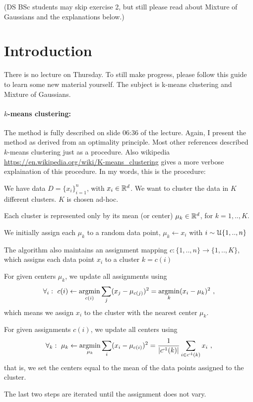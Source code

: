 

\renewcommand{\course}{Machine Learning}
\renewcommand{\exnum}{9}

\exercises
{}
\exercisestitle

(DS BSc students may skip exercise 2, but still please read about Mixture of Gaussians and the explanations below.)


\section*{Introduction}

There is no lecture on Thursday. To still make progress, please follow this guide to learn some new material yourself. The subject is k-means clustering and Mixture of Gaussians.

\paragraph{$k$-means clustering:} The method is fully described on slide 06:36 of the lecture. Again, I
present the method as derived from an optimality principle. Most other
references described $k$-means clustering just as a procedure. Also
wikipedia \url{https://en.wikipedia.org/wiki/K-means_clustering} gives
a more verbose explaination of this procedure. In my words, this is
the procedure:
\begin{items}
\item We have data $D=\{x_i\}_{i=1}^n$, with $x_i\in{\mathbb{R}}^d$. We want to cluster the data in $K$ different clusters. $K$ is chosen ad-hoc.
\item Each cluster is represented only by its mean (or center) $\mu_k\in{\mathbb{R}}^d$, for $k=1,..,K$.
\item We initially assign each $\mu_k$ to a random data point, $\mu_k \gets x_i$ with $i \sim{\cal U}\{1,..,n\}$
\item The algorithm also maintains an assignment mapping $c: \{1,..,n\} \to \{1,..,K\}$, which assigns each data point $x_i$ to a cluster $k=c(i)$
\item For given centers $\mu_k$, we update all assignments using
$$\forall_i:~ c(i) \gets \operatorname*{argmin}_{c(i)} \sum_j (x_j - \mu_{c(j)})^2 = \operatorname*{argmin}_k (x_i-\mu_k)^2 ~,$$
which means we assign $x_i$ to the cluster with the nearest center $\mu_k$.
\item For given assignments $c(i)$, we update all centers using
$$\forall_k:~ \mu_k \gets \operatorname*{argmin}_{\mu_k} \sum_i (x_i-\mu_{c(i)})^2 =  \frac{1}{|c^{{\hspace*{-.0pt}\text{\rm -}\hspace*{-.5pt}}1}(k)|} \sum_{i\in c^{{\hspace*{-.0pt}\text{\rm -}\hspace*{-.5pt}}1}(k)} x_i ~,$$
that is, we set the centers equal to the mean of the data points assigned to the cluster.
\item The last two steps are iterated until the assignment does not vary.
\end{items}

